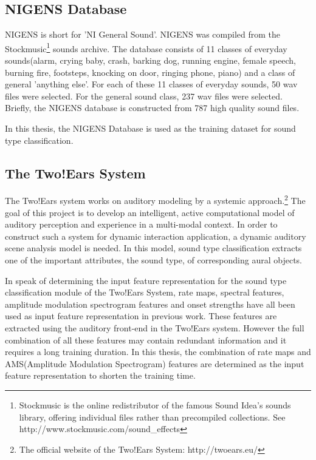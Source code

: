 \subsection{NIGENS Database} 
NIGENS is short for 'NI General Sound'.\cite{twoearsprojectdoc} NIGENS was compiled from the Stockmusic\footnote{Stockmusic is the online redistributor of the famous Sound Idea’s sounds library, offering individual files rather than precompiled collections. See http://www.stockmusic.com/sound\_effects}
sounds archive. The database consists of 11 classes of everyday sounds(alarm, crying baby, crash, barking dog, running engine, female speech, burning
fire, footsteps, knocking on door, ringing phone, piano) and a class of general 'anything else'. For each of these 11 classes of everyday sounds, 50 wav files were selected. For the general sound class, 237 wav files were selected. Briefly, the NIGENS database is constructed from 787 high quality sound files.


In this thesis, the NIGENS Database is used as the training dataset for sound type classification. 
\subsection{The Two!Ears System}
The Two!Ears system works on auditory modeling by a systemic approach.\footnote{The official website of the Two!Ears System: http://twoears.eu/} The goal of this project is to develop an intelligent, active computational model of auditory perception and experience in a multi-modal context. 
In order to construct such a system for dynamic interaction application, a dynamic auditory scene analysis model is needed. In this model, sound type classification extracts one of the important attributes, the sound type, of corresponding aural objects.

In speak of determining the input feature representation for the sound type classification module of the Two!Ears System, rate maps, spectral features, amplitude modulation spectrogram features and onset strengths have all been used as input feature representation in previous work. These features are extracted using the auditory front-end in the Two!Ears system. However the full combination of all these features may contain redundant information and it requires a long training duration. In this thesis, the combination of rate maps and AMS(Amplitude Modulation Spectrogram) features are determined as the input feature representation to shorten the training time.

